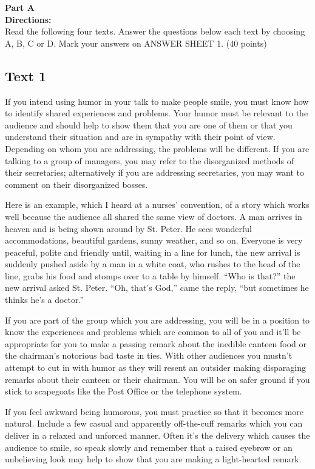 \noindent
\textbf{Part A}\\
\textbf{Directions:}\\
Read the following four texts. Answer the questions below each
	text by choosing A, B, C or
	D. Mark your answers
	on ANSWER SHEET 1. (40 points)

\newpage
\subsection{Text 1}


If you intend using humor in your talk to make people smile, you must
know how to identify shared experiences and problems. Your humor must be
relevant to the audience and should help to show them that you are one
of them or that you understand their situation and are in sympathy with
their point of view. Depending on whom you are addressing, the problems
will be different. If you are talking to a group of managers, you may
refer to the disorganized methods of their secretaries; alternatively if
you are addressing secretaries, you may want to comment on their
disorganized bosses.

Here is an example, which I heard at a nurses' convention, of a story
which works well because the audience all shared the same view of
doctors. A man arrives in heaven and is being shown around by St. Peter.
He sees wonderful accommodations, beautiful gardens, sunny weather, and
so on. Everyone is very peaceful, polite and friendly until, waiting in
a line for lunch, the new arrival is suddenly pushed aside by a man in a
white coat, who rushes to the head of the line, grabs his food and
stomps over to a table by himself. ``Who is that?'' the new arrival
asked St. Peter. ``Oh, that's God,'' came the reply, ``but sometimes he
thinks he's a doctor.''

If you are part of the group which you are addressing, you will be in a
position to know the experiences and problems which are common to all of
you and it'll be appropriate for you to make a passing remark about the
inedible canteen food or the chairman's notorious bad taste in ties.
With other audiences you mustn't attempt to cut in with humor as they
will resent an outsider making disparaging remarks about their canteen
or their chairman. You will be on safer ground if you stick to
scapegoats like the Post Office or the telephone system.

If you feel awkward being humorous, you must practice so that it becomes
more natural. Include a few casual and apparently off-the-cuff remarks
which you can deliver in a relaxed and unforced manner. Often it's the
delivery which causes the audience to smile, so speak slowly and
remember that a raised eyebrow or an unbelieving look may help to show
that you are making a light-hearted remark.

